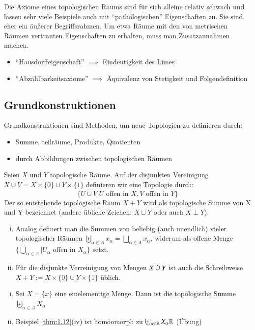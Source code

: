 \documentclass[a4paper,10pt]{scrartcl}
\begin{document}
\begin{note}
Die Axiome eines topologischen Raums sind für sich alleine relativ schwach und lassen sehr viele Beispiele auch mit "`pathologischen"' Eigenschaften zu. Sie sind eher ein äußerer Begriffsrahmen. Um etwa Räume mit den von metrischen Räumen vertrauten Eigenschaften zu erhalten, muss man Zusatzannahmen machen.
\begin{itemize}
  \item "`Hausdorffeigenschaft"' $\implies$ Eindeutigkeit des Limes
  \item "`Abzählbarkeitsaxiome"' $\implies$ Äquivalenz von Stetigkeit und Folgendefinition
\end{itemize}
\end{note}
\subsection{Grundkonstruktionen}
Grundkonstruktionen sind Methoden, um neue Topologien zu definieren durch:
\begin{itemize}
\item Summe, teilräume, Produkte, Quotienten
\item durch Abbildungen zwischen topologischen Räumen
\end{itemize}
\begin{df}
Seien $ X $ und $ Y $ topologische Räume. Auf der disjunkten Vereinigung $ X \dot \cup V =X \times \{ 0 \} \cup Y \times \{1\}$ definieren wir eine Topologie durch:
\[
\{U \mathbin{\dot{\cup}} V| U \text{ offen in } X, V \text{ offen in } Y\}
\]
Der so entstehende topologische Raum $ X+Y $ wird als topologische Summe von X und Y bezeichnet (andere übliche Zeichen: $X \sqcup Y$ oder auch $X \perp Y$).
\end{df}
\begin{note*}
\begin{enumerate}[(i)]
\item Analog definert man die Summen von beliebig (auch unendlich) vieler topologischer Räumen $\biguplus_{\alpha \in  A} x_\alpha=\bigsqcup_{\alpha\in A} x_\alpha$, widerum als offene Menge $\{\dot \bigcup_{\alpha\in A}| U_\alpha \text{ offen in } X_\alpha \}$ setzt.
\item Für die disjunkte Verreinigung von Mengen $ X \mathbin{\dot{\cup}} Y $ ist auch die Schreibweise $X+Y:= X\times\{0\} \cup Y\times \{1\}$ üblich.  
\end{enumerate}
\end{note*}
\begin{ex*}
\begin{enumerate}[(i)]
\item Sei $ X=\{ x\} $ eine einelementige Menge. Dann ist die topologische Summe $ \biguplus_{\alpha\in A}X_\alpha $
\item Beispiel \ref{thm:1.12}(iv) ist homöomorph zu $ \biguplus_{\alpha\in \mathbb{R}} X_\alpha \mathbb{R} $ (Übung)
\end{enumerate}
\end{ex*}
\end{document}
